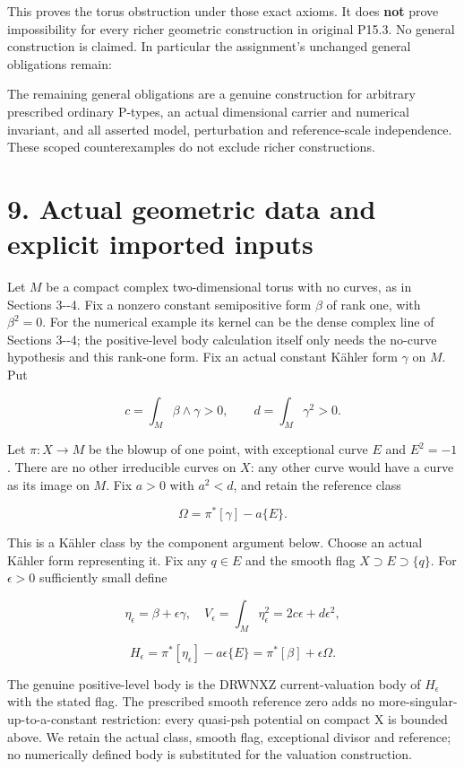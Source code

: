 \documentclass[11pt]{article}
\begin{document}
This proves the torus obstruction under those exact axioms. It does \textbf{not} prove impossibility for every richer geometric construction in original P15.3. No general construction is claimed. In particular the assignment's unchanged general obligations remain:

The remaining general obligations are a genuine construction for arbitrary prescribed ordinary P-\allowbreak{}types, an actual dimensional carrier and numerical invariant, and all asserted model, perturbation and reference-\allowbreak{}scale independence. These scoped counterexamples do not exclude richer constructions.

\section*{9. Actual geometric data and explicit imported inputs}

Let $M$ be a compact complex two-\allowbreak{}dimensional torus with no curves, as in Sections 3-\allowbreak{}-\allowbreak{}4. Fix a nonzero constant semipositive form $\beta$ of rank one, with $\beta^2=0$. For the numerical example its kernel can be the dense complex line of Sections 3-\allowbreak{}-\allowbreak{}4; the positive-\allowbreak{}level body calculation itself only needs the no-\allowbreak{}curve hypothesis and this rank-\allowbreak{}one form. Fix an actual constant Kähler form $\gamma$ on $M$. Put

\[c=\int_M\beta\wedge\gamma>0,\qquad d=\int_M\gamma^2>0.\]

Let $\pi:X\to M$ be the blowup of one point, with exceptional curve $E$ and $E^2=-1$. There are no other irreducible curves on $X$: any other curve would have a curve as its image on $M$. Fix $a>0$ with $a^2<d$, and retain the reference class

\[\Omega=\pi^*[\gamma]-a\{E\}.\]

This is a Kähler class by the component argument below. Choose an actual Kähler form representing it. Fix any $q\in E$ and the smooth flag $X\supset E\supset\{q\}$. For $\epsilon>0$ sufficiently small define

\[\eta_\epsilon=\beta+\epsilon\gamma,\quad V_\epsilon=\int_M\eta_\epsilon^2=2c\epsilon+d\epsilon^2,\]

\[H_\epsilon=\pi^*[\eta_\epsilon]-a\epsilon\{E\}=\pi^*[\beta]+\epsilon\Omega.\]

The genuine positive-\allowbreak{}level body is the DRWNXZ current-\allowbreak{}valuation body of $H_\epsilon$ with the stated flag. The prescribed smooth reference zero adds no more-\allowbreak{}singular-\allowbreak{}up-\allowbreak{}to-\allowbreak{}a-\allowbreak{}constant restriction: every quasi-\allowbreak{}psh potential on compact X is bounded above. We retain the actual class, smooth flag, exceptional divisor and reference; no numerically defined body is substituted for the valuation construction.
\end{document}

